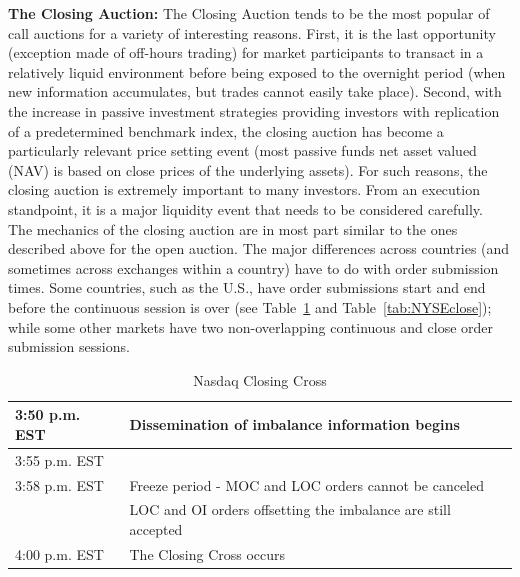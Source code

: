 \noindent\textbf{The Closing Auction:} The Closing Auction tends to be the most popular of call auctions for a variety of interesting reasons. First, it is the last opportunity (exception made of off-hours trading) for market participants to transact in a relatively liquid environment before being exposed to the overnight period (when new information accumulates, but trades cannot easily take place). Second, with the increase in passive investment strategies providing investors with replication of a predetermined benchmark index, the closing auction has become a particularly relevant price setting event (most passive funds net asset valued (NAV) is based on close prices of the underlying assets). For such reasons, the closing auction is extremely important to many investors. From an execution standpoint, it is a major liquidity event that needs to be considered carefully. \\

The mechanics of the closing auction are in most part similar to the ones described above for the open auction. The major differences across countries (and sometimes across exchanges within a country) have to do with order submission times. Some countries, such as the U.S., have order submissions start and end before the continuous session is over (see Table~\ref{tab:NASDAQclose} and Table~\ref{tab:NYSEclose}); while some other markets have two non-overlapping continuous and close order submission sessions. \\

\begin{table}[!ht]
   \centering
   \caption{Nasdaq Closing Cross\label{tab:NASDAQclose}}
   \begin{tabular}{ll} 
	3:50 p.m. EST & Dissemination of imbalance information begins  \\ \hline
	3:55 p.m. EST &  \\ \hline
	3:58 p.m. EST & Freeze period - MOC and LOC orders cannot be canceled  \\ 
	 & LOC and OI orders offsetting the imbalance are still accepted   \\ \hline	
	4:00 p.m. EST & The Closing Cross occurs		
   \end{tabular}
\end{table}	


